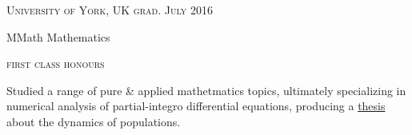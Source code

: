{\raggedright
  \textsc{\small{University of York, UK
    \hfill
    {\raggedleft
      grad. July 2016
    }
  }}

  {\raggedright\large {
    MMath Mathematics
  } \\}

  \textsc{\small{first class honours}}

  \normalsize{
    Studied a range of pure \& applied mathetmatics topics, ultimately specializing in numerical analysis of partial-integro differential equations, producing a \href{https://github.com/LukeSheard/senior_thesis}{thesis} about the dynamics of populations. 
  }

  \vspace{8pt}
}
